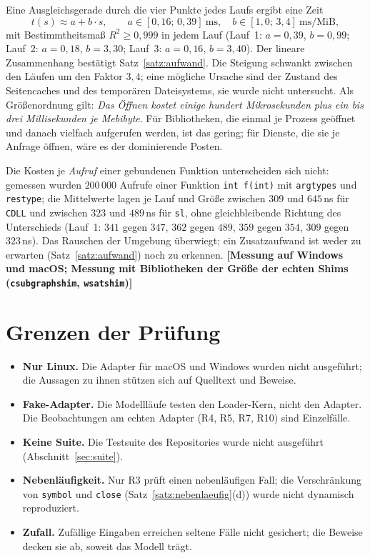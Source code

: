 \documentclass[a4paper,12pt,twoside]{report}
\DeclareRobustCommand{\_}{\ifmmode\mbox{\textunderscore}\else\textunderscore\allowbreak{}\fi}
\theoremstyle{definition}
\newcommand{\offen}[1]{\textcolor{accentred}{\textbf{[#1]}}}
\begin{document}
Eine Ausgleichsgerade durch die vier Punkte jedes Laufs ergibt eine Zeit
\[
t(s)\approx a+b\cdot s,\qquad a\in[0{,}16;\,0{,}39]\ \mathrm{ms},\quad b\in[1{,}0;\,3{,}4]\ \mathrm{ms}/\mathrm{MiB},
\]
mit Bestimmtheitsmaß $R^2\ge0{,}999$ in jedem Lauf (Lauf~1: $a=0{,}39$, $b=0{,}99$; Lauf~2: $a=0{,}18$, $b=3{,}30$; Lauf~3: $a=0{,}16$, $b=3{,}40$). Der lineare Zusammenhang bestätigt Satz~\ref{satz:aufwand}. Die Steigung schwankt zwischen den Läufen um den Faktor $3{,}4$; eine mögliche Ursache sind der Zustand des Seitencaches und des temporären Dateisystems, sie wurde nicht untersucht. Als Größenordnung gilt: \emph{Das Öffnen kostet einige hundert Mikrosekunden plus ein bis drei Millisekunden je Mebibyte}. Für Bibliotheken, die einmal je Prozess geöffnet und danach vielfach aufgerufen werden, ist das gering; für Dienste, die sie je Anfrage öffnen, wäre es der dominierende Posten.

Die Kosten je \emph{Aufruf} einer gebundenen Funktion unterscheiden sich nicht: gemessen wurden $200\,000$ Aufrufe einer Funktion \texttt{int f(int)} mit \texttt{argtypes} und \texttt{restype}; die Mittelwerte lagen je Lauf und Größe zwischen $309$ und $645$\,ns für \texttt{CDLL} und zwischen $323$ und $489$\,ns für \texttt{sl}, ohne gleichbleibende Richtung des Unterschieds (Lauf~1: $341$ gegen $347$, $362$ gegen $489$, $359$ gegen $354$, $309$ gegen $323$\,ns). Das Rauschen der Umgebung überwiegt; ein Zusatzaufwand ist weder zu erwarten (Satz~\ref{satz:aufwand}) noch zu erkennen. \offen{Messung auf Windows und macOS; Messung mit Bibliotheken der Größe der echten Shims (\texttt{csubgraph\_shim}, \texttt{wsat\_shim})}

\section{Grenzen der Prüfung}

\begin{itemize}
	\item \textbf{Nur Linux.} Die Adapter für macOS und Windows wurden nicht ausgeführt; die Aussagen zu ihnen stützen sich auf Quelltext und Beweise.
	\item \textbf{Fake-Adapter.} Die Modellläufe testen den Loader-Kern, nicht den Adapter. Die Beobachtungen am echten Adapter (R4, R5, R7, R10) sind Einzelfälle.
	\item \textbf{Keine Suite.} Die Testsuite des Repositories wurde nicht ausgeführt (Abschnitt~\ref{sec:suite}).
	\item \textbf{Nebenläufigkeit.} Nur R3 prüft einen nebenläufigen Fall; die Verschränkung von \texttt{symbol} und \texttt{close} (Satz~\ref{satz:nebenlaeufig}(d)) wurde nicht dynamisch reproduziert.
	\item \textbf{Zufall.} Zufällige Eingaben erreichen seltene Fälle nicht gesichert; die Beweise decken sie ab, soweit das Modell trägt.
\end{itemize}
\end{document}
